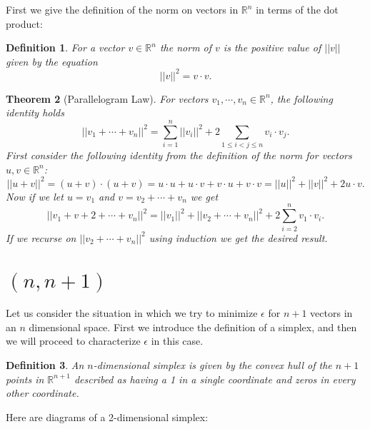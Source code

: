 \documentclass[11pt,letterpaper,twoside,english]{article}
\theoremstyle{theorem}
\newtheorem{theorem}{Theorem}[section]
\newtheorem{definition}[theorem]{Definition}
\theoremstyle{remark}
\providecommand{\R}{\mathbb{R}}
\begin{document}
First we give the definition of the norm on vectors in $\R^n$ in terms of the dot product:

\begin{definition}
For a vector $v\in\R^n$ the norm of $v$ is the positive value of $||v||$ given by the equation
$$
||v||^2=v\cdot v.
$$
\end{definition}
\begin{theorem}[Parallelogram Law]
For vectors $v_1,\cdots,v_n\in\R^n$, the following identity holds
$$
||v_1+\cdots+v_n||^2=\displaystyle\sum_{i=1}^n||v_i||^2+2\displaystyle\sum_{1\le i<j\le n}v_i\cdot v_j.
$$
\proof
First consider the following identity from the definition of the norm for vectors $u,v\in\R^n$:
$$
||u+v||^2=(u+v)\cdot (u+v)=u\cdot u+u\cdot v+ v\cdot u + v\cdot v=||u||^2+||v||^2+2u\cdot v.
$$
Now if we let $u=v_1$ and $v= v_2+\cdots+v_n$ we get 
$$
||v_1+v+2+\cdots+v_n||^2=||v_1||^2+||v_2+\cdots +v_n||^2+2\sum_{i=2}^n v_1\cdot v_i.
$$
If we recurse on $||v_2+\cdots +v_n||^2$ using induction we get the desired result. 
\end{theorem}


\section{$(n,n+1)$}
Let us consider the situation in which we try to minimize $\epsilon$ for $n+1$ vectors in an $n$ dimensional space. First we introduce the definition of a simplex, and then we will proceed to characterize $\epsilon$ in this case. 

\begin{definition}
An $n$-dimensional simplex is given by the convex hull of the $n+1$ points in $\R^{n+1}$ described as having a 1 in a single coordinate and zeros in every other coordinate. 
\end{definition}

Here are diagrams of a 2-dimensional simplex:
\end{document}
